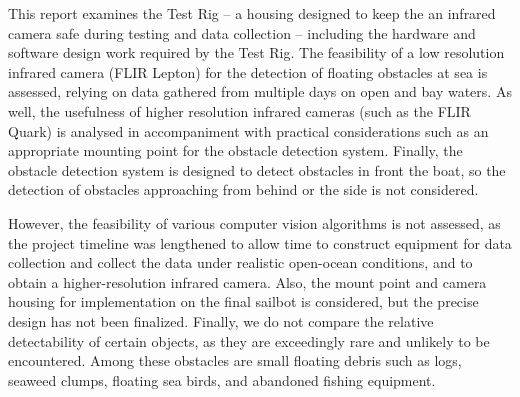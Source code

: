 
\iffalse
From the guideline:
This is where the subject of the report can be specified fully; indicate not only what you are examining, but also when and where, as appropriate. As well as knowing what to expect in your report, your reader needs to know what not to expect. Indicate the kinds of problems, places, times, and personnel that are not considered and the impact these omissions and constraints may have on your results. You may also want to explain why these limitations have been necessary.

Notes:
what does the report consider?
-test rig, design and development
-testing IR camera feasibility on two days
-developing a control system for the test rig, allowing for video capture
-the team might be able to get a better camera
-long cables seem to be fine

what didn't we do?
-we don't evaluate which algorithms are best
--we spent a lot of time getting ready to gather data (getting test rigs built and working)
--lots of time on video processing systems to get good contrast
-the lepton cannot see small objects such as logs
-we don't provide a final housing
--sailbot might use our lepton holder, but will need to design a smaller waterproof case for it

impact of omissions:
-we can suggest a lepton holder, but not a final housing
-our work will help the sailbot team test algorithms and gather data, but we can't comment on the best algorithms
\fi

This report examines the Test Rig -- a housing designed to keep the an infrared camera safe during testing and data collection -- including the hardware and software design work required by the Test Rig. The feasibility of a low resolution infrared camera (FLIR Lepton) for the detection of floating obstacles at sea is assessed, relying on data gathered from multiple days on open and bay waters. As well, the usefulness of higher resolution infrared cameras (such as the FLIR Quark) is analysed in accompaniment with practical considerations such as an appropriate mounting point for the obstacle detection system. Finally, the obstacle detection system is designed to detect obstacles in front the boat, so the detection of obstacles approaching from behind or the side is not considered.

However, the feasibility of various computer vision algorithms is not assessed, as the project timeline was lengthened to allow time to construct equipment for data collection and collect the data under realistic open-ocean conditions, and to obtain a higher-resolution infrared camera. Also, the mount point and camera housing for implementation on the final sailbot is considered, but the precise design has not been finalized. Finally, we do not compare the relative detectability of certain objects, as they are exceedingly rare and unlikely to be encountered. Among these obstacles are small floating debris such as logs, seaweed clumps, floating sea birds, and abandoned fishing equipment.

